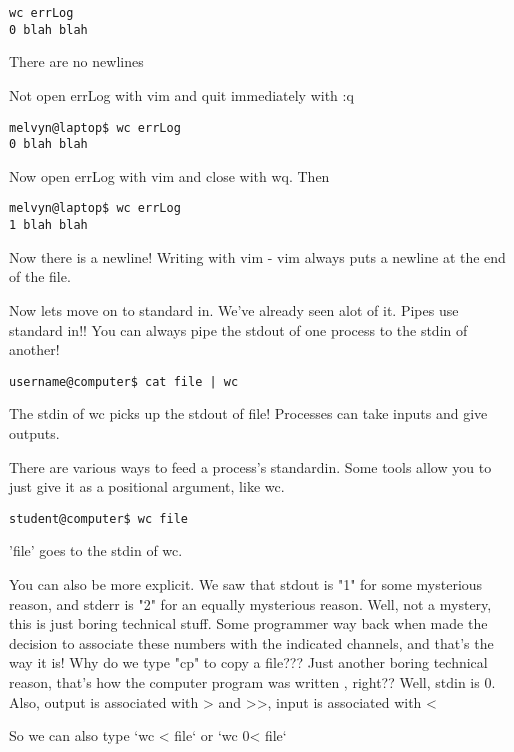 \documentclass[10pt]{article}
\begin{document}
\begin{lstlisting}[style=term]
wc errLog
0 blah blah
\end{lstlisting}

There are no newlines

Not open errLog with vim and quit immediately with :q

\begin{lstlisting}[style=term]
melvyn@laptop$ wc errLog
0 blah blah
\end{lstlisting}

Now open errLog with vim and close with wq. Then 

\begin{lstlisting}[style=term]
melvyn@laptop$ wc errLog
1 blah blah
\end{lstlisting}

Now there is a newline! Writing with vim - vim always puts a newline at the end of the file.

Now lets move on to standard in. We've already seen alot of it. Pipes use standard in!! You can always pipe the stdout of one process to the stdin of another!

\begin{lstlisting}[style=term]
username@computer$ cat file | wc
\end{lstlisting}

The stdin of wc picks up the stdout of file! Processes can take inputs and give outputs.

There are various ways to feed a process's standardin. Some tools allow you to just give it as a positional argument, like wc.

\begin{lstlisting}[style=term]
student@computer$ wc file
\end{lstlisting}

'file' goes to the stdin of wc.

You can also be more explicit. We saw that stdout is "1" for some mysterious reason, and stderr is "2" for an equally mysterious reason. Well, not a mystery, this is just boring technical stuff. Some programmer way back when made the decision to associate these numbers with the indicated channels, and that's the way it is! Why do we type "cp" to copy a file??? Just another boring technical reason, that's how the computer program was written , right?? Well, stdin is 0. Also, output is associated with > and >>, input is associated with <

So we can also type `wc < file` or `wc 0< file`
\end{document}
